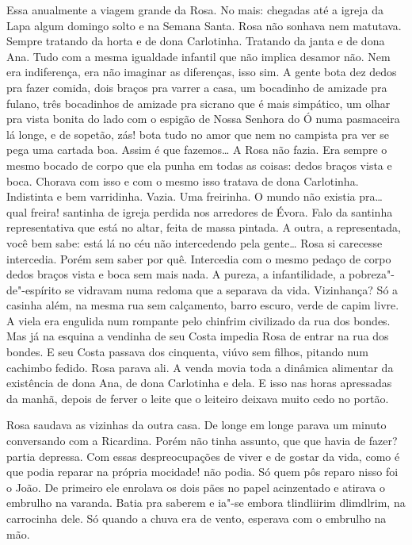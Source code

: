 \begin{linenumbers}
Essa anualmente a viagem grande da Rosa. No mais: chegadas até a igreja
da Lapa algum domingo solto e na Semana Santa. Rosa não sonhava nem
matutava. Sempre tratando da horta e de dona Carlotinha. Tratando da
janta e de dona Ana. Tudo com a mesma igualdade infantil que não implica
desamor não. Nem era indiferença, era não imaginar as diferenças, isso
sim. A gente bota dez dedos pra fazer comida, dois braços pra varrer a
casa, um bocadinho de amizade pra fulano, três bocadinhos de amizade pra
sicrano que é mais simpático, um olhar pra vista bonita do lado com o
espigão de Nossa Senhora do Ó numa pasmaceira lá longe, e de sopetão,
zás! bota tudo no amor que nem no campista pra ver se pega uma cartada
boa. Assim é que fazemos\ldots{} A Rosa não fazia. Era sempre o mesmo bocado
de corpo que ela punha em todas as coisas: dedos braços vista e boca.
Chorava com isso e com o mesmo isso tratava de dona Carlotinha.
Indistinta e bem varridinha. Vazia. Uma freirinha. O mundo não existia
pra\ldots{} qual freira! santinha de igreja perdida nos arredores de Évora.
Falo da santinha representativa que está no altar, feita de massa
pintada. A outra, a representada, você bem sabe: está lá no céu não
intercedendo pela gente\ldots{} Rosa si carecesse intercedia. Porém sem saber
por quê. Intercedia com o mesmo pedaço de corpo dedos braços vista e
boca sem mais nada. A pureza, a infantilidade, a pobreza"-de"-espírito se
vidravam numa redoma que a separava da vida. Vizinhança? Só a casinha
além, na mesma rua sem calçamento, barro escuro, verde de capim livre. A
viela era engulida num rompante pelo chinfrim civilizado da rua dos
bondes. Mas já na esquina a vendinha de seu Costa impedia Rosa de entrar
na rua dos bondes. E seu Costa passava dos cinquenta, viúvo sem filhos,
pitando num cachimbo fedido. Rosa parava ali. A venda movia toda a
dinâmica alimentar da existência de dona Ana, de dona Carlotinha e dela.
E isso nas horas apressadas da manhã, depois de ferver o leite que o
leiteiro deixava muito cedo no portão.

Rosa saudava as vizinhas da outra casa. De longe em longe parava um
minuto conversando com a Ricardina. Porém não tinha assunto, que que
havia de fazer? partia depressa. Com essas despreocupações de viver e de
gostar da vida, como é que podia reparar na própria mocidade! não podia.
Só quem pôs reparo nisso foi o João. De primeiro ele enrolava os dois
pães no papel acinzentado e atirava o embrulho na varanda. Batia pra
saberem e ia"-se embora tlindliirim dlimdlrim, na carrocinha dele. Só
quando a chuva era de vento, esperava com o embrulho na mão.


\end{linenumbers}
